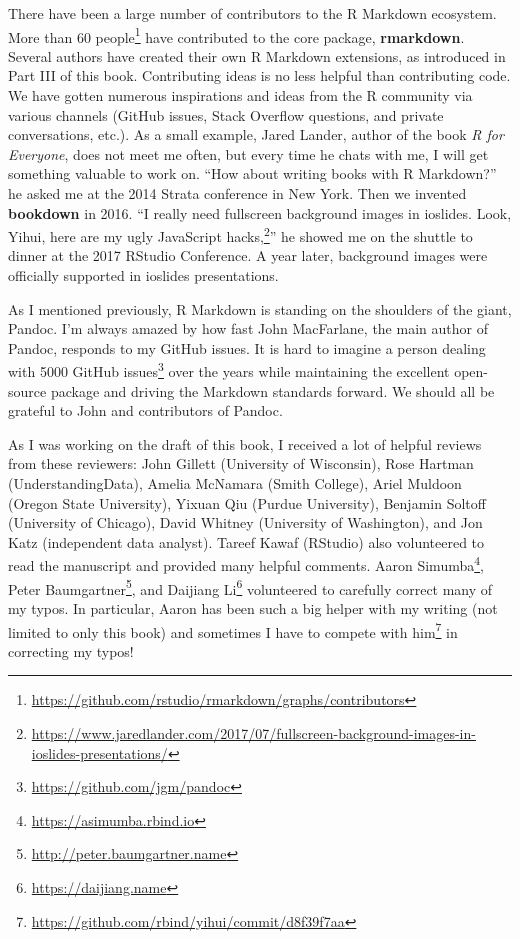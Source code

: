 \documentclass[
  11pt,
]{krantz}
\renewcommand{\href}[2]{#2\footnote{\url{#1}}}
\theoremstyle{definition}
\theoremstyle{definition}
\theoremstyle{definition}
\theoremstyle{definition}
\theoremstyle{remark}
\begin{document}
There have been a large number of contributors to the R Markdown ecosystem. \href{https://github.com/rstudio/rmarkdown/graphs/contributors}{More than 60 people} have contributed to the core package, \textbf{rmarkdown}. Several authors have created their own R Markdown extensions, as introduced in Part III of this book. Contributing ideas is no less helpful than contributing code. We have gotten numerous inspirations and ideas from the R community via various channels (GitHub issues, Stack Overflow questions, and private conversations, etc.). As a small example, Jared Lander, author of the book \emph{R for Everyone}, does not meet me often, but every time he chats with me, I will get something valuable to work on. ``How about writing books with R Markdown?'' he asked me at the 2014 Strata conference in New York. Then we invented \textbf{bookdown} in 2016. ``I really need fullscreen background images in ioslides. \href{https://www.jaredlander.com/2017/07/fullscreen-background-images-in-ioslides-presentations/}{Look, Yihui, here are my ugly JavaScript hacks,}'' he showed me on the shuttle to dinner at the 2017 RStudio Conference. A year later, background images were officially supported in ioslides presentations.

As I mentioned previously, R Markdown is standing on the shoulders of the giant, Pandoc. I'm always amazed by how fast John MacFarlane, the main author of Pandoc, responds to my GitHub issues. It is hard to imagine a person dealing with \href{https://github.com/jgm/pandoc}{5000 GitHub issues} over the years while maintaining the excellent open-source package and driving the Markdown standards forward. We should all be grateful to John and contributors of Pandoc.

As I was working on the draft of this book, I received a lot of helpful reviews from these reviewers: John Gillett (University of Wisconsin), Rose Hartman (UnderstandingData), Amelia McNamara (Smith College), Ariel Muldoon (Oregon State University), Yixuan Qiu (Purdue University), Benjamin Soltoff (University of Chicago), David Whitney (University of Washington), and Jon Katz (independent data analyst). Tareef Kawaf (RStudio) also volunteered to read the manuscript and provided many helpful comments. \href{https://asimumba.rbind.io}{Aaron Simumba}, \href{http://peter.baumgartner.name}{Peter Baumgartner}, and \href{https://daijiang.name}{Daijiang Li} volunteered to carefully correct many of my typos. In particular, Aaron has been such a big helper with my writing (not limited to only this book) and \href{https://github.com/rbind/yihui/commit/d8f39f7aa}{sometimes I have to compete with him} in correcting my typos!
\end{document}
